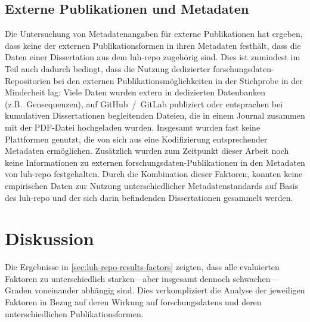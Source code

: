\subsection{Externe Publikationen und Metadaten}\label{sec:luh-repo-results-external-metadata}
Die Untersuchung von Metadatenangaben für externe Publikationen hat ergeben, dass keine der externen Publikationsformen in ihren Metadaten festhält, dass die Daten einer Dissertation aus dem \gls{luh-repo} zugehörig sind.
Dies ist zumindest im Teil auch dadurch bedingt, dass die Nutzung dedizierter \gls{forschungsdaten}-Repositorien bei den externen Publikationsmöglichkeiten in der Stichprobe in der Minderheit lag:
Viele Daten wurden extern in dedizierten Datenbanken (z.B.~Gensequenzen), auf GitHub~/~GitLab publiziert oder entsprachen bei kumulativen Dissertationen begleitenden Dateien, die in einem Journal zusammen mit der PDF-Datei hochgeladen wurden.
Insgesamt wurden fast keine Plattformen genutzt, die von sich aus eine Kodifizierung entsprechender Metadaten ermöglichen.
Zusätzlich wurden zum Zeitpunkt dieser Arbeit noch keine Informationen zu externen \gls{forschungsdaten}-Publikationen in den Metadaten von \gls{luh-repo} festgehalten.
Durch die Kombination dieser Faktoren, konnten keine empirischen Daten zur Nutzung unterschiedlicher Metadatenstandards auf Basis des \gls{luh-repo} und der sich darin befindenden Dissertationen gesammelt werden.

\section{Diskussion}\label{sec:luh-repo-discussion}
Die Ergebnisse in \cref{sec:luh-repo-results-factors} zeigten, dass alle evaluierten Faktoren zu unterschiedlich starken---aber insgesamt dennoch schwachen---Graden voneinander abhängig sind.
Dies verkompliziert die Analyse der jeweiligen Faktoren in Bezug auf deren Wirkung auf \glspl{forschungsdaten} und deren unterschiedlichen Publikationsformen.

